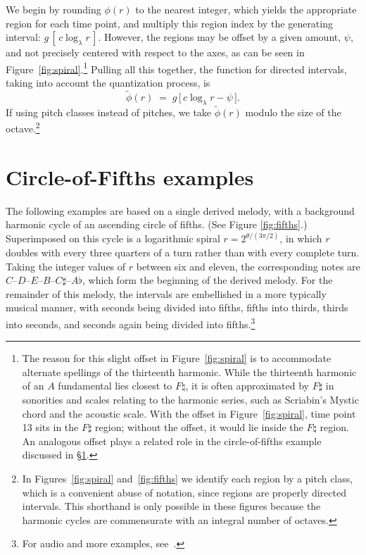 \documentclass[11pt]{article}
\theoremstyle{plain}
\theoremstyle{definition}
\theoremstyle{remark}
\begin{document}
We begin by rounding $\phi(r)$ to the nearest integer, which yields the appropriate region for each time point, and multiply this region index by the generating interval: $g\,[\,c \log_\lambda r\,]$. However, the regions may be offset by a given amount, $\psi$, and not precisely centered with respect to the axes, as can be seen in Figure~\ref{fig:spiral}.\footnote{The reason for this slight offset in Figure~\ref{fig:spiral} is to accommodate alternate spellings of the thirteenth harmonic. While the thirteenth harmonic of an $A$ fundamental lies closest to $F\natural$, it is often approximated by $F\sharp$ in sonorities and scales relating to the harmonic series, such as Scriabin's Mystic chord and the acoustic scale. With the offset in Figure~\ref{fig:spiral}, time point 13 sits in the $F\sharp$ region; without the offset, it would lie inside the $F\natural$ region. An analogous offset plays a related role in the circle-of-fifths example discussed in \S\ref{sec:examples}.} Pulling all this together, the function for directed intervals, taking into account the quantization process, is
\begin{equation}
  \tilde{\phi}(r) \;=\; g\,\bigl[\, c \log_\lambda r - \psi \,\bigr].
  \label{eq:phi-tilde}
\end{equation}
If using pitch classes instead of pitches, we take $\tilde{\phi}(r)$ modulo the size of the octave.\footnote{In Figures~\ref{fig:spiral} and~\ref{fig:fifths} we identify each region by a pitch class, which is a convenient abuse of notation, since regions are properly directed intervals. This shorthand is only possible in these figures because the harmonic cycles are commensurate with an integral number of octaves.}


\section{Circle-of-Fifths examples}
\label{sec:examples}

The following examples are based on a single derived melody, with a background harmonic cycle of an ascending circle of fifths. (See Figure \ref{fig:fifths}.) Superimposed on this cycle is a logarithmic spiral $r = 2^{\theta / (3\pi/2)}$, in which $r$ doubles with every three quarters of a turn rather than with every complete turn. Taking the integer values of $r$ between six and eleven, the corresponding notes are $C$--$D$--$E$--$B$--$C\sharp$--$A\flat$, which form the beginning of the derived melody. For the remainder of this melody, the intervals are embellished in a more typically musical manner, with seconds being divided into fifths, fifths into thirds, thirds into seconds, and seconds again being divided into fifths.\footnote{For audio and more examples, see~\cite{infinitecanons}.}
\end{document}
